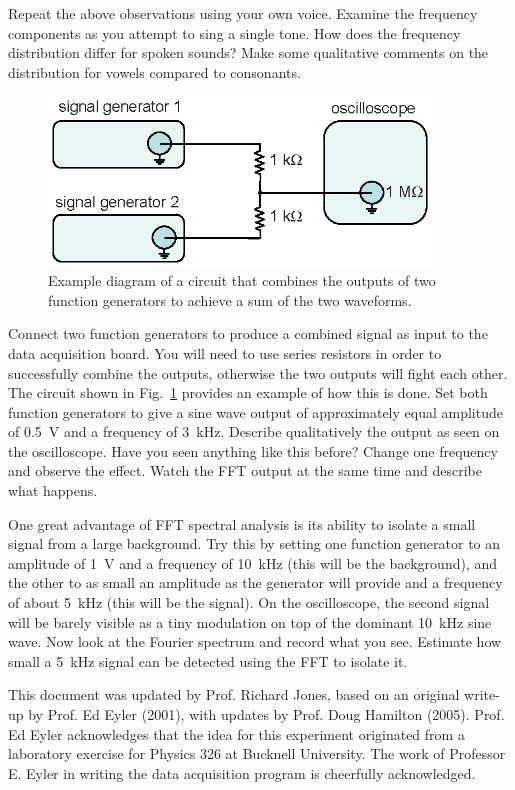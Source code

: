 \documentclass{revtex4}
\begin{document}
Repeat the above observations using your own voice. Examine the frequency
components as you attempt to sing a single tone. How does the frequency
distribution differ for spoken sounds?  Make some qualitative comments on
the distribution for vowels compared to consonants.

\begin{figure}
\includegraphics[width=4in]{sumcircuitfig.eps}
\caption{\label{sumcircuit} 
Example diagram of a circuit that combines the outputs of two
function generators to achieve a sum of the two waveforms.}
\end{figure}

Connect two function generators to produce a combined signal as input to
the data acquisition board.  You will need to use series resistors in order
to successfully combine the outputs, otherwise the two outputs will fight
each other.  The circuit shown in Fig.~\ref{sumcircuit} provides an example
of how this is done.  Set both function generators to give a sine wave output
of approximately equal amplitude of 0.5~V and a frequency of 3~kHz.
Describe qualitatively the output as seen on the oscilloscope. Have you seen
anything like this before? Change one frequency and observe the effect. Watch
the FFT output at the same time and describe what happens.

One great advantage of FFT spectral analysis is its ability to isolate a
small signal from a large background. Try this by setting one function
generator to an amplitude of 1~V and a frequency of 10~kHz (this will be
the background), and the other to as small an amplitude as the generator
will provide and a frequency of about 5~kHz (this will be the signal). On
the oscilloscope, the second signal will be barely visible as a tiny
modulation on top of the dominant 10~kHz sine wave. Now look at the Fourier
spectrum and record what you see. Estimate how small a 5~kHz signal can be
detected using the FFT to isolate it.

\begin{acknowledgments}
This document was updated by Prof. Richard Jones, based on an original
write-up by Prof. Ed Eyler (2001), with updates by Prof. Doug Hamilton (2005).
Prof. Ed Eyler acknowledges that the idea for this experiment originated from
a laboratory exercise for Physics 326 at Bucknell University. The work of
Professor E. Eyler in writing the data acquisition program is cheerfully
acknowledged.
\end{acknowledgments}
\end{document}
